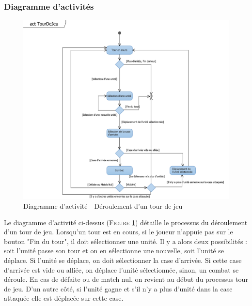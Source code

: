 \documentclass[a4paper,11pt]{article}
\begin{document}
		\subsubsection{Diagramme d'activités}
			\begin{figure}[ht!]
				\includegraphics{Diagrammes/Tour/actTourDeJeu.png}
				\caption{Diagramme d'activité - Déroulement d'un tour de jeu}
				\label{fig:acttour}
				\end{figure}
			\vspace*{1cm}
			Le diagramme d'activité ci-dessus (\textsc{Figure \ref{fig:acttour}}) détaille le processus du déroulement d'un tour de jeu. Lorsqu'un tour est en cours, si le joueur n'appuie pas sur le bouton "Fin du tour", il doit sélectionner une unité. Il y a alors deux possibilités : soit l'unité passe son tour et on en sélectionne une nouvelle, soit l'unité se déplace. Si l'unité se déplace, on doit sélectionner la case d'arrivée. Si cette case d'arrivée est vide ou alliée, on déplace l'unité sélectionnée, sinon, un combat se déroule. En cas de défaite ou de match nul, on revient au début du processus tour de jeu. D'un autre côté, si l'unité gagne et s'il n'y a plus d'unité dans la case attaquée elle est déplacée sur cette case.
			\newpage
\end{document}
